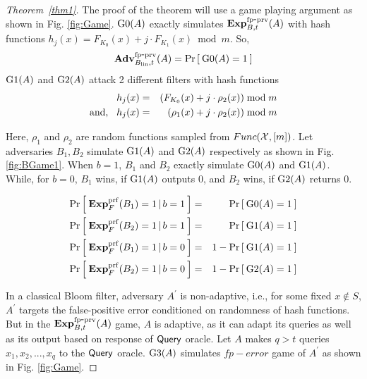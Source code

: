 \begin{proof}[Theorem~\ref{thm1}]
The proof of the theorem will use a game playing argument as shown in Fig. \ref{fig:Game}. $\text{G0}(A)$ exactly simulates $\mathrm{\mathbf{Exp}}^{\mathrm{fp\mbox{-}prv}}_{B,t}(A)$ with hash functions $h_j(x) =  F_{K_0}(x) + j\cdot F_{K_1}(x) \bmod m$. So,
\begin{equation}
\mathrm{\mathbf{Adv}}^{\mathrm{fp\mbox{-}prv}}_{B_{\mathrm{lin}},t}(A) = \Pr\left[\: \text{G0}(A)=1 \:\right]\label{eq:0}
\end{equation}
 $\text{G1}(A)$ and $\text{G2}(A)$ attack 2 different filters with hash functions 
\begin{eqnarray*}
h_j(x) &=& ( F_{K_0}(x) + j\cdot \rho_2(x)) \bmod m\\
\mathrm{and,}\hspace*{2ex} h_j(x) &=& ( \rho_1(x) + j \cdot \rho_2(x)) \bmod m 
\end{eqnarray*}

Here, $\rho_1$ and $\rho_2$ are random functions sampled from $Func({\cal X},[m])$. Let adversaries $B_1, B_2$ simulate $\text{G1}(A)$ and $\text{G2}(A)$ respectively as shown in Fig. \ref{fig:BGame1}. When $b=1$, $B_1$ and $B_2$ exactly simulate $\text{G0}(A)$
and $\text{G1}(A)$. While, for $b=0$, $B_1$ wins, if $\text{G1}(A)$ outputs 0, and  $B_2$ wins, if $\text{G2}(A)$ returns 0.

\begin{eqnarray}
\Pr\left[\: \mathbf{Exp}^{\mathrm{prf}}_{F}(B_1) = 1\,|\,b=1 \:\right] &=& \Pr\left[\: \text{G0}(A)=1 \:\right]\label{eq:m1}\\
\Pr\left[\: \mathbf{Exp}^{\mathrm{prf}}_{F}(B_2) = 1\,|\,b=1 \:\right] &=& \Pr\left[\: \text{G1}(A)=1 \:\right]\label{eq:m2}\\
\Pr\left[\: \mathbf{Exp}^{\mathrm{prf}}_{F}(B_1) = 1\,|\,b=0 \:\right] &=& 1-\Pr\left[\: \text{G1}(A)=1 \:\right]\label{eq:m3}\\
\Pr\left[\: \mathbf{Exp}^{\mathrm{prf}}_{F}(B_2) = 1\,|\,b=0 \:\right] &=& 1-\Pr\left[\: \text{G2}(A)=1 \:\right]\label{eq:m4}
\end{eqnarray}

\par{In a classical Bloom filter, adversary $A^{'}$ is non-adaptive, i.e., for some fixed $x \notin S$, $A^{'}$ targets the false-positive error conditioned on randomness of hash functions. But in the $\mathrm{\mathbf{Exp}}^{\mathrm{fp\mbox{-}prv}}_{B,t}(A)$ game, $A$ is adaptive, as it can adapt its queries as well as its output based on response of $\mathsf{Query}$ oracle. Let $A$ makes $q>t$ queries $x_1, x_2, ..., x_q$ to the $\mathsf{Query}$ oracle. $\text{G3}(A)$ simulates $fp-error$ game of $A^{'}$ as shown in Fig. \ref{fig:Game}.}


\end{proof}
